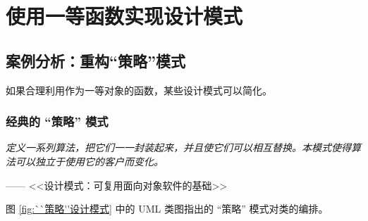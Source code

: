\section{使用一等函数实现设计模式}
\subsection{案例分析：重构``策略''模式}

如果合理利用作为一等对象的函数，某些设计模式可以简化。

\subsubsection{经典的 ``策略'' 模式}

\textit{定义一系列算法，把它们一一封装起来，并且使它们可以相互替换。本模式使得算法可以独立于使用它的客户而变化。}  

\hfill —— <<设计模式：可复用面向对象软件的基础>>

图 \ref{fig:``策略''设计模式} 中的 UML 类图指出的 ``策略'' 模式对类的编排。

